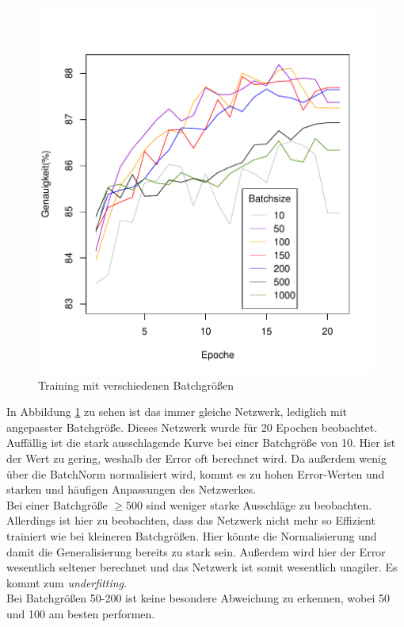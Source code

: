 \begin{figure}[H]
	\centering
	\includegraphics[scale=0.9]{./bilder/batchsize_measurement}
	\caption{Training mit verschiedenen Batchgrößen}
	\label{fig:batchsize}
\end{figure}
In Abbildung \ref{fig:batchsize} zu sehen ist das immer gleiche Netzwerk, lediglich mit angepasster Batchgröße. Dieses Netzwerk wurde für 20 Epochen beobachtet.\\
Auffällig ist die stark ausschlagende Kurve bei einer Batchgröße von 10. Hier ist der Wert zu gering, weshalb der Error oft berechnet wird. Da außerdem wenig über die BatchNorm normalisiert wird, kommt es zu hohen Error-Werten und starken und häufigen Anpassungen des Netzwerkes.\\
Bei einer Batchgröße $\geq 500$ sind weniger starke Ausschläge zu beobachten. Allerdings ist hier zu beobachten, dass das Netzwerk nicht mehr so Effizient trainiert wie bei kleineren Batchgrößen. Hier könnte die Normalisierung und damit die Generalisierung bereits zu stark sein. Außerdem wird hier der Error wesentlich seltener berechnet und das Netzwerk ist somit wesentlich unagiler. Es kommt zum \textit{underfitting}.\\
Bei Batchgrößen 50-200 ist keine besondere Abweichung zu erkennen, wobei 50 und 100 am besten performen.
